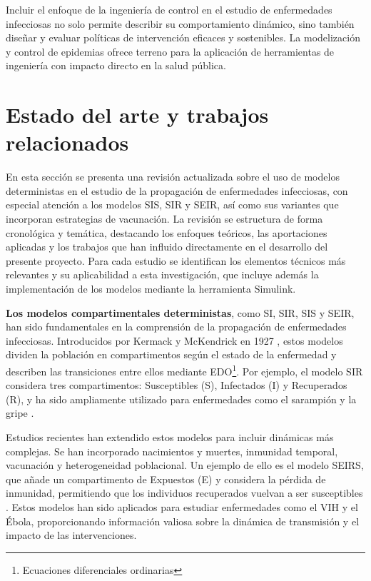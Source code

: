 \begin{enumerate}
Incluir el enfoque de la ingeniería de control en el estudio de enfermedades infecciosas no solo permite describir su comportamiento dinámico, sino también diseñar y evaluar políticas de intervención eficaces y sostenibles. La modelización y control de epidemias ofrece terreno para la aplicación de herramientas de ingeniería con impacto directo en la salud pública.

\section{Estado del arte y trabajos relacionados}
En esta sección se presenta una revisión actualizada sobre el uso de modelos deterministas en el estudio de la propagación de enfermedades infecciosas, con especial atención a los modelos SIS, SIR y SEIR, así como sus variantes que incorporan estrategias de vacunación. La revisión se estructura de forma cronológica y temática, destacando los enfoques teóricos, las aportaciones aplicadas y los trabajos que han influido directamente en el desarrollo del presente proyecto. Para cada estudio se identifican los elementos técnicos más relevantes y su aplicabilidad a esta investigación, que incluye además la implementación de los modelos mediante la herramienta Simulink.

\textbf{Los modelos compartimentales deterministas}, como SI, SIR, SIS y SEIR, han sido fundamentales en la comprensión de la propagación de enfermedades infecciosas. Introducidos por Kermack y McKendrick en 1927 \cite{brauer2005kermack}, estos modelos dividen la población en compartimentos según el estado de la enfermedad y describen las transiciones entre ellos mediante EDO\footnote{Ecuaciones diferenciales ordinarias}. Por ejemplo, el modelo SIR considera tres compartimentos: Susceptibles (S), Infectados (I) y Recuperados (R), y ha sido ampliamente utilizado para enfermedades como el sarampión y la gripe \cite{carcione2020simulation}.

Estudios recientes han extendido estos modelos para incluir dinámicas más complejas. Se han incorporado nacimientos y muertes, inmunidad temporal, vacunación y heterogeneidad poblacional. Un ejemplo de ello es el modelo SEIRS, que añade un compartimento de Expuestos (E) y considera la pérdida de inmunidad, permitiendo que los individuos recuperados vuelvan a ser susceptibles \cite{trawicki2017deterministic}. Estos modelos han sido aplicados para estudiar enfermedades como el VIH y el Ébola, proporcionando información valiosa sobre la dinámica de transmisión y el impacto de las intervenciones.


\end{enumerate}
